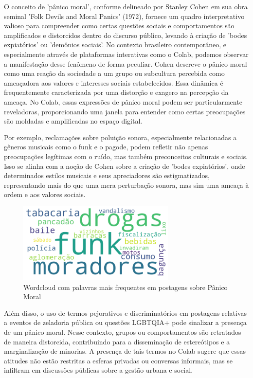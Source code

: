 O conceito de 'pânico moral', conforme delineado por Stanley Cohen em sua obra seminal 'Folk Devils and Moral Panics' (1972), fornece um quadro interpretativo valioso para compreender como certas questões sociais e comportamentos são amplificados e distorcidos dentro do discurso público, levando à criação de 'bodes expiatórios' ou 'demônios sociais'. No contexto brasileiro contemporâneo, e especialmente através de plataformas interativas como o Colab, podemos observar a manifestação desse fenômeno de forma peculiar. Cohen descreve o pânico moral como uma reação da sociedade a um grupo ou subcultura percebida como ameaçadora aos valores e interesses sociais estabelecidos. Essa dinâmica é frequentemente caracterizada por uma distorção e exagero na percepção da ameaça. No Colab, essas expressões de pânico moral podem ser particularmente reveladoras, proporcionando uma janela para entender como certas preocupações são moldadas e amplificadas no espaço digital.

Por exemplo, reclamações sobre poluição sonora, especialmente relacionadas a gêneros musicais como o funk e o pagode, podem refletir não apenas preocupações legítimas com o ruído, mas também preconceitos culturais e sociais. Isso se alinha com a noção de Cohen sobre a criação de 'bodes expiatórios', onde determinados estilos musicais e seus apreciadores são estigmatizados, representando mais do que uma mera perturbação sonora, mas sim uma ameaça à ordem e aos valores sociais.

\begin{figure}[htb]
	\centering
	\includegraphics[width=0.7\textwidth]{images/wordcloud_moral.png}
	\caption{Wordcloud com palavras mais frequentes em postagens sobre Pânico Moral}
	\label{fig:wordcloud_moral}
\end{figure}

Além disso, o uso de termos pejorativos e discriminatórios em postagens relativas a eventos de zeladoria pública ou questões LGBTQIA+ pode sinalizar a presença de um pânico moral. Nesse contexto, grupos ou comportamentos são retratados de maneira distorcida, contribuindo para a disseminação de estereótipos e a marginalização de minorias. A presença de tais termos no Colab sugere que essas atitudes não estão restritas a esferas privadas ou conversas informais, mas se infiltram em discussões públicas sobre a gestão urbana e social.

